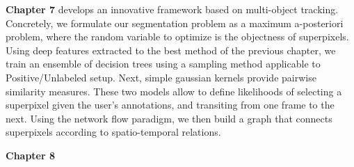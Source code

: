 \textbf{Chapter 7} develops an innovative framework based on multi-object tracking.
Concretely, we formulate our segmentation problem as a maximum a-posteriori problem, where the random variable to optimize is the objectness of superpixels.
Using deep features extracted to the best method of the previous chapter, we train an ensemble of decision trees using a sampling method applicable to Positive/Unlabeled setup.
Next, simple gaussian kernels provide pairwise similarity measures.
These two models allow to define likelihoods of selecting a superpixel given the user's annotations, and transiting from one frame to the next.
Using the network flow paradigm, we then build a graph that connects superpixels according to spatio-temporal relations.

\textbf{Chapter 8}





